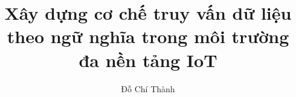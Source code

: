 \documentclass[a4paper,12pt,3p]{report}
\begin{document}
\title{\LARGE {\bf Xây dựng cơ chế truy vấn dữ liệu theo ngữ nghĩa trong môi trường đa nền tảng IoT}\\
 \vspace*{7mm}
}


\author{Đỗ Chí Thành}




\normallinespacing
\maketitle

\preface






\body








%
%


%
%
%
%
\end{document}
